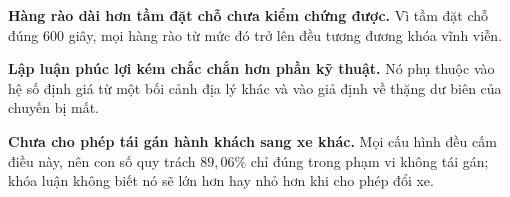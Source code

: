 \textbf{Hàng rào dài hơn tầm đặt chỗ chưa kiểm chứng được.} Vì tầm đặt chỗ đúng 600 giây, mọi
hàng rào từ mức đó trở lên đều tương đương khóa vĩnh viễn.

\textbf{Lập luận phúc lợi kém chắc chắn hơn phần kỹ thuật.} Nó phụ thuộc vào hệ số định giá từ
một bối cảnh địa lý khác và vào giả định về thặng dư biên của chuyến bị mất.

\textbf{Chưa cho phép tái gán hành khách sang xe khác.} Mọi cấu hình đều cấm điều này, nên con
số quy trách $89{,}06\%$ chỉ đúng trong phạm vi không tái gán; khóa luận không biết nó sẽ lớn hơn
hay nhỏ hơn khi cho phép đổi xe.
